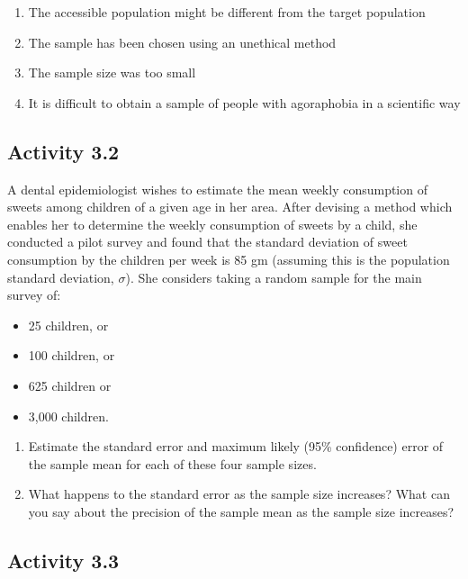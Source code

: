 \documentclass[
]{memoir}
\providecommand{\tightlist}{%
  \setlength{\itemsep}{0pt}\setlength{\parskip}{0pt}}
\begin{document}
\begin{enumerate}
\def\labelenumi{\alph{enumi})}
\tightlist
\item
  The accessible population might be different from the target population
\item
  The sample has been chosen using an unethical method
\item
  The sample size was too small
\item
  It is difficult to obtain a sample of people with agoraphobia in a scientific way
\end{enumerate}

\hypertarget{activity-3.2}{%
\subsection*{Activity 3.2}\label{activity-3.2}}

A dental epidemiologist wishes to estimate the mean weekly consumption of sweets among children of a given age in her area. After devising a method which enables her to determine the weekly consumption of sweets by a child, she conducted a pilot survey and found that the standard deviation of sweet consumption by the children per week is 85 gm (assuming this is the population standard deviation, \(\sigma\)). She considers taking a random sample for the main survey of:

\begin{itemize}
\tightlist
\item
  25 children, or
\item
  100 children, or
\item
  625 children or
\item
  3,000 children.
\end{itemize}

\begin{enumerate}
\def\labelenumi{\alph{enumi})}
\tightlist
\item
  Estimate the standard error and maximum likely (95\% confidence) error of the sample mean for each of these four sample sizes.
\item
  What happens to the standard error as the sample size increases? What can you say about the precision of the sample mean as the sample size increases?
\end{enumerate}

\hypertarget{activity-3.3}{%
\subsection*{Activity 3.3}\label{activity-3.3}}
\end{document}
